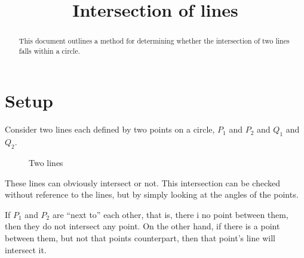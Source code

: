 \documentclass{article}
\title{Intersection of lines}
\begin{document}
\maketitle

\begin{abstract}
This document outlines a method for determining whether the intersection of two lines falls within a circle.
\end{abstract}

\section{Setup}
Consider two lines each defined by two points on a circle, $P_1$ and $P_2$
and $Q_1$ and $Q_2$.

\vspace{1pc}

\begin{figure}[h]
\centering
{}
\caption{Two lines}
\end{figure}

These lines can obviously intersect or not. This intersection can be checked 
without reference to the lines, but by simply looking at the angles of the points.

If $P_1$ and $P_2$ are ``next to'' each other, that is, there i no point between them, then they do not intersect any point.
On the other hand, if there is a point between them, but not that points counterpart, then that point's line will intersect it.

\pagebreak
\end{document}
